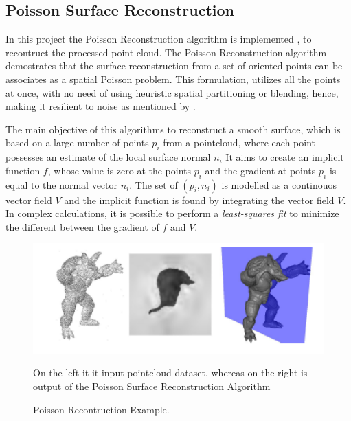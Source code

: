 \documentclass[12pt]{report}
\begin{document}
\subsection{Poisson Surface Reconstruction}
\label{section:Poisson Surface Reconstruction}
In this project the Poisson Reconstruction algorithm is implemented , to recontruct the processed point cloud.
The Poisson Reconstruction algorithm demostrates that the surface reconstruction from a set of oriented points can be associates as a spatial Poisson problem.
This formulation, utilizes all the points at once, with no need of using heuristic spatial partitioning or blending, hence, making it resilient to noise as mentioned by .

The main objective of this algorithms to reconstruct a smooth surface, which is based on a large number of points $p_i$ from a pointcloud, where each point possesses an estimate of the local surface normal $n_i$
It aims to create an implicit function $f$, whose value is zero at the points $p_i$ and the gradient at points $p_i$ is equal to the normal vector $n_i$.
The set of $(p_i,n_i)$ is modelled as a continouos vector field $V$ and the implicit function is found by integrating the vector field $V$.
In complex calculations, it is possible to perform a \textit{least-squares fit} to minimize the different between the gradient of $f$ and $V$.



\begin{figure}[H]%
  \centering
  \includegraphics[width=1\textwidth]{poisson_example.png}
 \caption{Poisson Recontruction Example.} On the left it it input pointcloud dataset, whereas on the right is output of the Poisson Surface Reconstruction Algorithm\cite[]{Poisson}
 \label{fig:Poisson_def} 
\end{figure}
\end{document}
